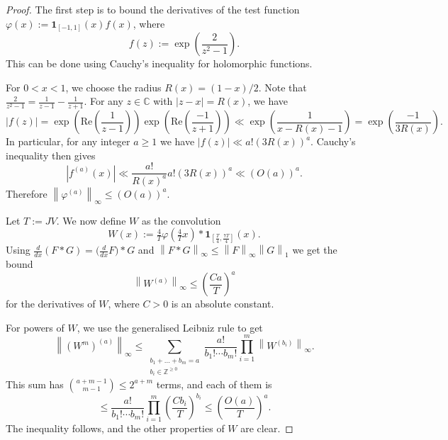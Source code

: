 \documentclass[11pt]{amsart}
\theoremstyle{definition}
\renewcommand{\leq}{\leqslant}
\renewcommand{\geq}{\geqslant}
\renewcommand{\Re}{\mathrm{Re}}
\newcommand{\norm}[1]{\left\|#1\right\|}
\newcommand{\abs}[1]{\left|#1\right|}
\newcommand{\ind}[1]{\mathbf{1}_{#1}}
\newcommand{\Z}{\mathbb{Z}}
\newcommand{\C}{\mathbb{C}}
\newcommand{\curlyL}{V}
\newcommand{\repR}{J}
\begin{document}
\begin{proof}%
The first step is to bound the derivatives of the test function $\varphi(x) := \ind{[-1, 1]}(x) f(x)$, where
\begin{equation*}
f(z) :=  \exp \left(\frac{2}{z^2-1}\right).
\end{equation*}
This can be done using Cauchy's inequality for holomorphic functions. 

For $0 < x < 1$, we choose the radius $R(x) = (1-x)/2$. Note that $\tfrac{2}{z^2-1} = \tfrac{1}{z-1} - \tfrac{1}{z+1}$. For any $z\in \C$ with $|z-x| = R(x)$, we have
\begin{equation*}
|f(z)| = \exp \left(\Re \left(\frac{1}{z-1}\right)\right) \exp \left(\Re \left(\frac{-1}{z+1}\right)\right) \ll \exp \left( \frac{1}{x-R(x)-1}\right) = \exp \left(\frac{-1}{3R(x)}\right).
\end{equation*}
In particular, for any integer $a\geq 1$ we have $\abs{f(z)}\ll a! (3R(x))^a$. Cauchy's inequality then gives 
\begin{equation*}
\abs{f^{(a)}(x)} \ll \frac{a!}{R(x)^{a}} a! (3R(x))^a \ll \left(O(a)\right)^a.
\end{equation*}
Therefore $\norm{\varphi^{(a)}} _{\infty} \leq \left(O(a)\right)^a$.

Let $T := \repR\curlyL$. We now define $W$ as the convolution
\begin{equation*}
W(x) := \tfrac{4}{T}\varphi\left(\tfrac{4}{T}x\right)*\ind{\left[\tfrac{T}{4}, \tfrac{7T}{4}\right]}(x) .
\end{equation*}
Using $\frac{d}{dx}(F*G)=\big(\frac{d}{dx}F\big)*G$ and $\norm{F*G}_{\infty} \leq \norm{F}_{\infty}\norm{G}_1$ we get the bound 
\begin{equation*}
\norm{W^{(a)}}_{\infty} \leq \left(\frac{Ca}{T}\right)^a
\end{equation*}
for the derivatives of $W$, where $C>0$ is an absolute constant.

For powers of $W$, we use the generalised Leibniz rule to get
\begin{equation*}
\norm{(W^m)^{(a)}}_{\infty} \leq \sum_{\substack{b_1+ \ldots +b_m = a\\ b_i\in \Z^{\geq 0}}} \frac{a!}{b_1!\cdots b_m!} \prod_{i=1}^{m} \norm{W^{(b_i)}}_{\infty}. 
\end{equation*}
This sum has ${a+m-1\choose m-1}\leq 2^{a+m}$ terms, and each of them is 
\begin{equation*}
\leq \frac{a!}{b_1!\cdots b_m!}   \prod_{i=1}^{m} \left(\frac{Cb_i}{T}\right)^{b_i} \leq \left(\frac{O(a)}{T}\right)^{a}.
\end{equation*}
The inequality follows, and the other properties of $W$ are clear.
\end{proof}
\end{document}
